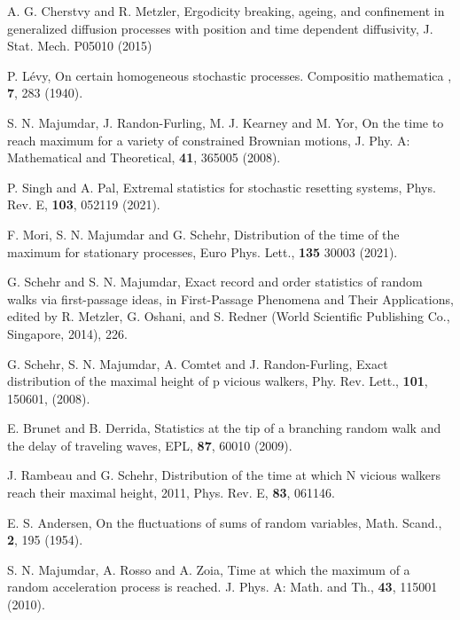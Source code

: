 \documentclass[showpacs,amsmath,amssymb,aps,pre,twocolumn,]{revtex4-1}
\def\greenw#1{{\color{black} #1}}
\begin{document}
\begin{thebibliography}{}
\greenw{A. G. Cherstvy and R. Metzler, Ergodicity breaking, ageing, and confinement in generalized diffusion processes with position and time dependent diffusivity, J. Stat. Mech. P05010 (2015)}



P. L\'{e}vy, On certain homogeneous stochastic processes. Compositio mathematica , \textbf{7}, 283 (1940).



S. N. Majumdar, J. Randon-Furling, M. J. Kearney and M. Yor, On the time to reach maximum for a variety of constrained Brownian motions, J. Phy. A: Mathematical and Theoretical, \textbf{41}, 365005 (2008).

P. Singh and A. Pal, Extremal statistics for stochastic resetting systems, Phys. Rev. E, \textbf{103}, 052119 (2021).

F. Mori, S. N. Majumdar and G. Schehr, Distribution of the time of the maximum for stationary processes, Euro Phys. Lett., \textbf{135} 30003 (2021).

G. Schehr and S. N. Majumdar, Exact record and order statistics of random walks via first-passage ideas, in First-Passage
Phenomena and Their Applications, edited by R. Metzler, G. Oshani, and S. Redner (World Scientific Publishing Co.,
Singapore, 2014), 226.

G. Schehr, S. N. Majumdar, A. Comtet and J. Randon-Furling, Exact distribution of the maximal height of p vicious walkers, Phy. Rev. Lett., \textbf{101}, 150601, (2008).


E. Brunet and B. Derrida, Statistics at the tip of a branching random walk and the delay of traveling waves, EPL, \textbf{87}, 60010 (2009).


J. Rambeau and G. Schehr, Distribution of the time at which N vicious
walkers reach their maximal height, 2011,  Phys. Rev. E, \textbf{83}, 061146.

E. S. Andersen, On the fluctuations of sums of random variables, Math. Scand., \textbf{2}, 195 (1954).



S. N. Majumdar, A. Rosso and A. Zoia, Time at which the maximum of a random acceleration process is reached. J. Phys. A: Math. and Th., \textbf{43}, 115001 (2010).


\end{thebibliography}
\end{document}
